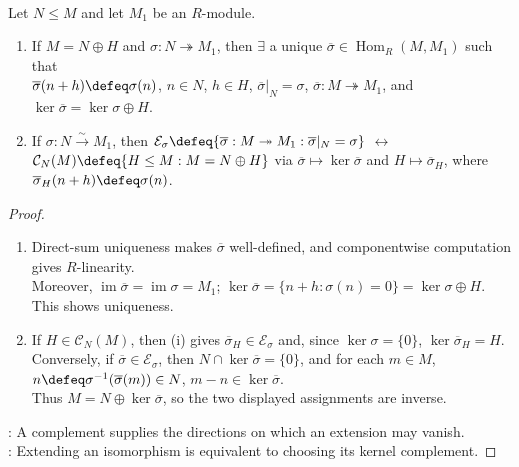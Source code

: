 \begin{theorem} \label{thm:direct-summands-extend-epimorphisms} \\
Let $N\leq M$ and let $M_1$ be an $R$-module.
\begin{enumerate}[label=(\roman*)]
\setlength{\itemsep}{0pt}
\item If $M=N\oplus H$ and $\sigma:N\twoheadrightarrow M_1$, then $\exists$ a unique $\overline{\sigma}\in\operatorname{Hom}_R(M,M_1)$ such that\\
$\overline{\sigma}(n+h)\defeq\sigma(n)$, $n\in N$, $h\in H$, $\overline{\sigma}|_N=\sigma$, $\overline{\sigma}:M\twoheadrightarrow M_1$, and $\ker\overline{\sigma}=\ker\sigma\oplus H$.
\item If $\sigma:N\xrightarrow{\sim}M_1$, then $\mathcal{E}_{\sigma}\defeq\{\overline{\sigma}:M\twoheadrightarrow M_1:\overline{\sigma}|_N=\sigma\}$ $\longleftrightarrow$ $\mathcal{C}_N(M)\defeq\{H\leq M:M=N\oplus H\}$ via $\overline{\sigma}\mapsto\ker\overline{\sigma}$ and $H\mapsto\overline{\sigma}_H$, where $\overline{\sigma}_H(n+h)\defeq\sigma(n)$.
\end{enumerate}
\begin{proof}
\begin{enumerate}[label=(\roman*)]
\setlength{\itemsep}{0pt}
\item Direct-sum uniqueness makes $\overline{\sigma}$ well-defined, and componentwise computation gives $R$-linearity.\\
Moreover, $\operatorname{im}\overline{\sigma}=\operatorname{im}\sigma=M_1$; $\ker\overline{\sigma}=\{n+h:\sigma(n)=0\}=\ker\sigma\oplus H$. This shows uniqueness.
\item If $H\in\mathcal{C}_N(M)$, then (i) gives $\overline{\sigma}_H\in\mathcal{E}_{\sigma}$ and, since $\ker\sigma=\{0\}$, $\ker\overline{\sigma}_H=H$.\\
Conversely, if $\overline{\sigma}\in\mathcal{E}_{\sigma}$, then $N\cap\ker\overline{\sigma}=\{0\}$, and for each $m\in M$, $n\defeq\sigma^{-1}(\overline{\sigma}(m))\in N$, $m-n\in\ker\overline{\sigma}$.\\
Thus $M=N\oplus\ker\overline{\sigma}$, so the two displayed assignments are inverse.
\end{enumerate}
: A complement supplies the directions on which an extension may vanish.\\
: Extending an isomorphism is equivalent to choosing its kernel complement.
\end{proof}
\end{theorem}

